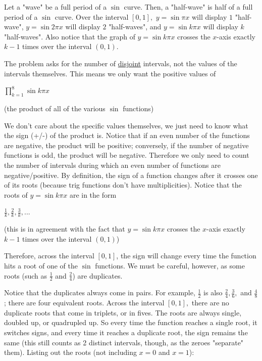 \begin{enumerate}
 
Let a "wave" be a full period of a $\sin$ curve. Then, a "half-wave" is half of a full period of a $\sin$ curve. Over the interval $[0, 1],$ $y= \sin{\pi x}$ will display $1$ "half-wave", $y= \sin{2\pi x}$ will display $2$ "half-waves", and $y= \sin{k\pi x}$ will display $k$ "half-waves". Also notice that the graph of $y= \sin{k \pi x}$ crosses the $x$-axis exactly $k-1$ times over the interval $(0, 1)$.

 
The problem asks for the number of \href{https://artofproblemsolving.com/wiki/index.php?title=Disjoint}{disjoint} intervals, not the values of the intervals themselves. This means we only want the positive values of

 
$\prod_{k=1}^8 \sin{k\pi x}$

 
(the product of all of the various $\sin$ functions)

 
We don't care about the specific values themselves, we just need to know what the sign (+/-) of the product is. Notice that if an even number of the functions are negative, the product will be positive; conversely, if the number of negative functions is odd, the product will be negative. Therefore we only need to count the number of intervals during which an even number of functions are negative/positive. By definition, the sign of a function changes after it crosses one of its roots (because trig functions don't have multiplicities). Notice that the roots of $y = \sin{k\pi x}$ are in the form

 
$\frac{1}{k}, \frac{2}{k}, \frac{3}{k},...$

 
(this is in agreement with the fact that $y= \sin{k \pi x}$ crosses the $x$-axis exactly $k-1$ times over the interval $(0, 1)$)

 
Therefore, across the interval $[0, 1]$, the sign will change every time the function hits a root of one of the $\sin$ functions. We must be careful, however, as some roots (such as $\frac{1}{2}$ and $\frac{2}{4}$) are duplicates.

 
Notice that the duplicates always come in pairs. For example, $\frac{1}{2}$ is also $\frac{2}{4}, \frac{3}{6},$ and $\frac{4}{8}$; there are four equivalent roots. Across the interval $[0, 1],$ there are no duplicate roots that come in triplets, or in fives. The roots are always single, doubled up, or quadrupled up. So every time the function reaches a single root, it switches signs, and every time it reaches a duplicate root, the sign remains the same (this still counts as 2 distinct intervals, though, as the zeroes "separate" them). Listing out the roots (not including $x=0$ and $x=1$):


\end{enumerate}
